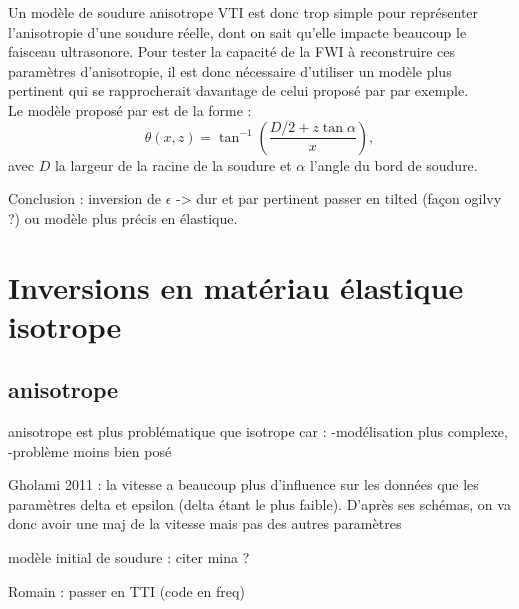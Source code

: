  
Un modèle de soudure anisotrope VTI est donc trop simple pour représenter l'anisotropie d'une soudure réelle, dont on sait qu'elle impacte beaucoup le faisceau ultrasonore. Pour tester la capacité de la FWI à reconstruire ces paramètres d'anisotropie, il est donc nécessaire d'utiliser un modèle plus pertinent qui se rapprocherait davantage de celui proposé par \cite{ogilvy} par exemple.\\

Le modèle proposé par \cite{ogilvy} est de la forme : 
\begin{equation}
	\theta(x,z) = \tan^{-1}\left( \frac{D/2 + z\tan\alpha}{x} \right),
\end{equation}
avec $D$ la largeur de la racine de la soudure et $\alpha$  l'angle du bord de soudure.

 Conclusion : inversion de $\epsilon$ -> dur et par pertinent
passer en tilted (façon ogilvy ?) ou modèle plus précis en élastique.

\section{Inversions en matériau élastique isotrope}




\subsection{anisotrope}

anisotrope est plus problématique que isotrope car : 
-modélisation plus complexe,
-problème moins bien posé

Gholami 2011 : la vitesse a beaucoup plus d'influence sur les données que les paramètres delta et epsilon (delta étant le plus faible). D'après ses schémas, on va donc avoir une maj de la vitesse mais pas des autres paramètres

modèle initial de soudure : citer mina ?



Romain : passer en TTI (code en freq)

